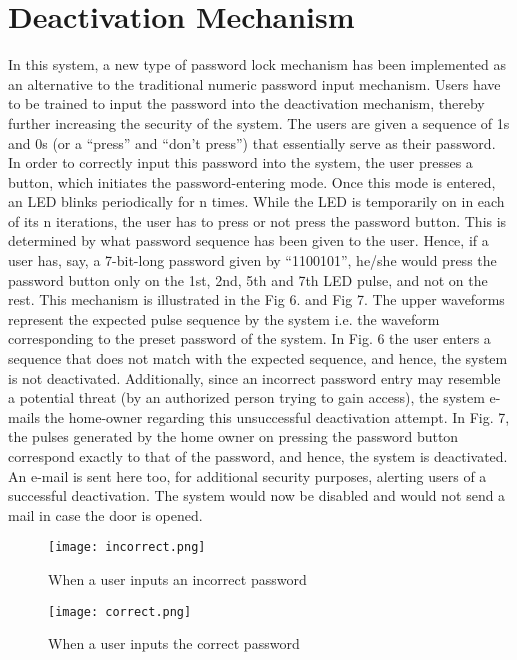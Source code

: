 \documentclass[letterpaper, 10 pt, conference]{ieeeconf}
\begin{document}
\section{Deactivation Mechanism}
In this system, a new type of password lock mechanism has been implemented as an alternative to the traditional numeric password input mechanism. Users have to be trained to input the password into the deactivation mechanism, thereby further increasing the security of the system. The users are given a sequence of 1s and 0s (or a “press” and “don’t press”) that essentially serve as their password. In order to correctly input this password into the system, the user presses a button, which initiates the password-entering mode. Once this mode is entered, an LED blinks periodically for n times. While the LED is temporarily on in each of its n iterations, the user has to press or not press the password button. This is determined by what password sequence has been given to the user. Hence, if a user has, say, a 7-bit-long password given by “1100101”, he/she would press the password button only on the 1st, 2nd, 5th and 7th LED pulse, and not on the rest.
This mechanism is illustrated in the Fig 6. and Fig 7. The upper waveforms represent the expected pulse sequence by the system i.e. the waveform corresponding to the preset password of the system. In Fig. 6 the user enters a sequence that does not match with the expected sequence, and hence, the system is not deactivated. Additionally, since an incorrect password entry may resemble a potential threat (by an authorized person trying to gain access), the system e-mails the home-owner regarding this unsuccessful deactivation attempt. In Fig. 7, the pulses generated by the home owner on pressing the password button correspond exactly to that of the password, and hence, the system is deactivated. An e-mail is sent here too, for additional security purposes, alerting users of a successful deactivation. The system would now be disabled and would not send a mail in case the door is opened.

\begin{figure}[h!]
\centering
\texttt{[image: incorrect.png]}
\caption{\label{fig:ipfinal}When a user inputs an incorrect password}
\end{figure}

\begin{figure}[h!]
\centering
\texttt{[image: correct.png]}
\caption{\label{fig:ipfinal}When a user inputs the correct password}
\end{figure}
\end{document}
